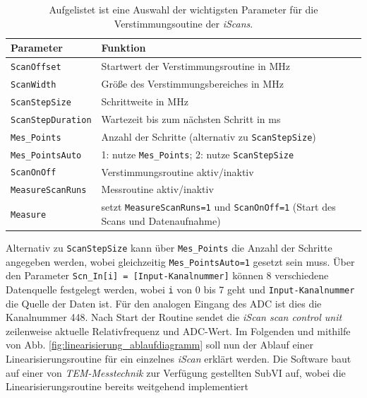 \begin{table}
	\begin{tabular}{p{}p{}}
		\toprule
			Parameter & Funktion \\
		\midrule[1px]
		\hline
			\lstinline|ScanOffset| & Startwert der Verstimmungsroutine in MHz\\
			\lstinline|ScanWidth| & Größe des Verstimmungsbereiches in MHz\\
			\lstinline|ScanStepSize| & Schrittweite in MHz\\
			\lstinline|ScanStepDuration| & Wartezeit bis zum nächsten Schritt in ms\\
			\lstinline|Mes_Points| & Anzahl der Schritte (alternativ zu
			\lstinline|ScanStepSize|)\\
			\lstinline|Mes_PointsAuto| & 1: nutze \lstinline|Mes_Points|; 2: nutze
			\lstinline|ScanStepSize|\\
			\lstinline|ScanOnOff| & Verstimmungsroutine aktiv/inaktiv\\
			\lstinline|MeasureScanRuns| & Messroutine aktiv/inaktiv\\
			\lstinline|Measure| & setzt
			\lstinline|MeasureScanRuns=1| und \lstinline|ScanOnOff=1| (Start des Scans
			und Datenaufnahme)\\
		\bottomrule[1px]
	\end{tabular}
	\caption[Parameter der Verstimmungsoutine]{Aufgelistet ist eine
	Auswahl der wichtigsten Parameter für die Verstimmungsoutine der
	\textit{iScans}.}
	\label{tab:verstimmungsroutine_parameter}
\end{table}
Alternativ zu \lstinline|ScanStepSize| kann über \lstinline|Mes_Points| die
Anzahl der Schritte angegeben werden, wobei gleichzeitig
\lstinline|Mes_PointsAuto=1| gesetzt sein muss. Über den Parameter
\lstinline|Scn_In[i] = [Input-Kanalnummer]| können 8
verschiedene Datenquelle festgelegt werden, wobei
\lstinline|i| von 0 bis 7 geht und \lstinline|Input-Kanalnummer| die Quelle
der Daten ist. Für den analogen Eingang des ADC ist dies die Kanalnummer 448.
Nach Start der Routine sendet die \textit{iScan scan control unit} zeilenweise
aktuelle Relativfrequenz und ADC-Wert. Im Folgenden und mithilfe von Abb.
\ref{fig:linearisierung_ablaufdiagramm} soll nun der Ablauf einer
Linearisierungsroutine für ein einzelnes \textit{iScan} erklärt werden. Die
Software baut auf einer von \textit{TEM-Messtechnik} zur Verfügung gestellten
SubVI auf, wobei die Linearisierungsroutine bereits weitgehend implementiert
